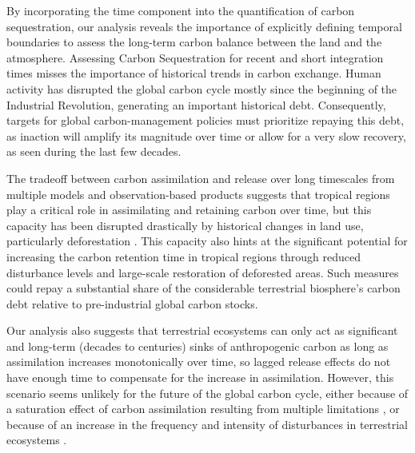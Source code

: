 \documentclass[ProofPDF]{./Styles/Jnls-Template-V3}
\begin{document}
By incorporating the time component into the quantification of carbon sequestration, our analysis reveals the importance of explicitly defining temporal boundaries to assess the long-term carbon balance between the land and the atmosphere. Assessing Carbon Sequestration for recent and short integration times misses the importance of historical trends in carbon exchange. Human activity has disrupted the global carbon cycle mostly since the beginning of the Industrial Revolution, generating an important historical debt. Consequently, targets for global carbon-management policies must prioritize repaying this debt, as inaction will amplify its magnitude over time or allow for a very slow recovery, as seen during the last few decades.

The tradeoff between carbon assimilation and release over long timescales from multiple models and observation-based products suggests that tropical regions play a critical role in assimilating and retaining carbon over time, but this capacity has been disrupted drastically by historical changes in land use, particularly deforestation \citep{Li2022}. This capacity also hints at the significant potential for increasing the carbon retention time in tropical regions through reduced disturbance levels and large-scale restoration of deforested areas. Such measures could repay a substantial share of the considerable terrestrial biosphere's carbon debt relative to pre-industrial global carbon stocks.

Our analysis also suggests that terrestrial ecosystems can only act as significant and long-term (decades to centuries) sinks of anthropogenic carbon as long as assimilation increases monotonically over time, so lagged release effects do not have enough time to compensate for the increase in assimilation. However, this scenario seems unlikely for the future of the global carbon cycle, either because of a saturation effect of carbon assimilation resulting from multiple limitations \citep{Melnikova2021,Friedlingstein2023}, or because of an increase in the frequency and intensity of disturbances in terrestrial ecosystems \citep{Xu2021,Sitch2024}.
\end{document}
